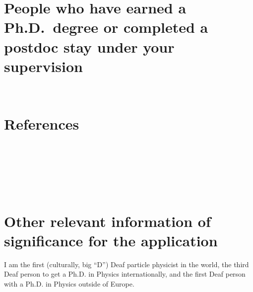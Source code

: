 \vspace{-2.0em}\section{People who have earned a Ph.D.~degree or completed a postdoc stay under your supervision\noneyet}
\, \\

\vspace{-4.5em}\section{References}
{
\footnotesize
{}\\
\\
\\
\\
\\
}

\vspace{-2.0em}\section{Other relevant information of significance for the application}
I am the first (culturally, big \enquote{D}) Deaf particle physicist in the world, the third Deaf person to get a Ph.D. in Physics internationally, and the first Deaf person with a Ph.D. in Physics outside of Europe.
